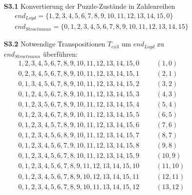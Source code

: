\begin{figure}[H]
	\begin{enumerate}
		\item[\textbf{S3.1}] Konvertierung der Puzzle-Zustände in Zahlenreihen
		      \begin{align*}
			      end_{Loyd} = \{1,2,3,4,5,6,7,8,9,10,11,12,13,14,15,0\} \\
			      end_{Stroetmann} = \{0,1,2,3,4,5,6,7,8,9,10,11,12,13,14,15\}
		      \end{align*}
		\item[\textbf{S3.2}] Notwendige Transpositionen $T_{ex3}$ um $end_{Loyd}$ zu $end_{Stroetmann}$ überführen:
		      \begin{align*}
			      1,2,3,4,5,6,7,8,9,10,11,12,13,14,15,0 & \hspace{20pt} (1,0)   \\
			      0,2,3,4,5,6,7,8,9,10,11,12,13,14,15,1 & \hspace{20pt} (2,1)   \\
			      0,1,3,4,5,6,7,8,9,10,11,12,13,14,15,2 & \hspace{20pt} (3,2)   \\
			      0,1,2,4,5,6,7,8,9,10,11,12,13,14,15,3 & \hspace{20pt} (4,3)   \\
			      0,1,2,3,5,6,7,8,9,10,11,12,13,14,15,4 & \hspace{20pt} (5,4)   \\
			      0,1,2,3,4,6,7,8,9,10,11,12,13,14,15,5 & \hspace{20pt} (6,5)   \\
			      0,1,2,3,4,5,7,8,9,10,11,12,13,14,15,6 & \hspace{20pt} (7,6)   \\
			      0,1,2,3,4,5,6,8,9,10,11,12,13,14,15,7 & \hspace{20pt} (8,7)   \\
			      0,1,2,3,4,5,6,7,9,10,11,12,13,14,15,8 & \hspace{20pt} (9,8)   \\
			      0,1,2,3,4,5,6,7,8,10,11,12,13,14,15,9 & \hspace{20pt} (10,9)  \\
			      0,1,2,3,4,5,6,7,8,9,11,12,13,14,15,10 & \hspace{20pt} (11,10) \\
			      0,1,2,3,4,5,6,7,8,9,10,12,13,14,15,11 & \hspace{20pt} (12,11) \\
			      0,1,2,3,4,5,6,7,8,9,10,11,13,14,15,12 & \hspace{20pt} (13,12) \\

\end{align*}
\end{enumerate}
\end{figure}
